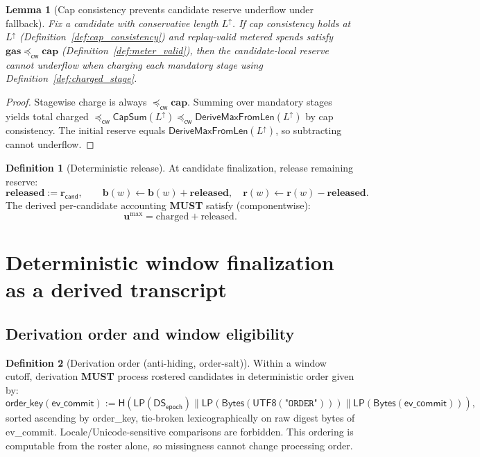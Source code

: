\documentclass[11pt]{article}
\newcommand{\MUST}{\textbf{MUST}}
\newcommand{\1}{\mathbf{1}}
\newcommand{\Hash}{\mathsf{H}}
\newcommand{\DS}{\mathsf{DS}}
\newcommand{\LP}{\mathsf{LP}}
\newcommand{\cwise}{\preceq_{\textsf{cw}}}
\theoremstyle{definition}
\newtheorem{definition}{Definition}
\theoremstyle{plain}
\newtheorem{lemma}{Lemma}
\begin{document}
\begin{lemma}[Cap consistency prevents candidate reserve underflow under fallback]
\label{lem:cap_prevents_underflow}
Fix a candidate with conservative length $L^\uparrow$. If cap consistency holds at $L^\uparrow$ (Definition~\ref{def:cap_consistency}) and replay-valid metered spends satisfy $\mathbf{gas}\cwise\mathbf{cap}$ (Definition~\ref{def:meter_valid}), then the candidate-local reserve cannot underflow when charging each mandatory stage using Definition~\ref{def:charged_stage}.
\end{lemma}
\begin{proof}
Stagewise charge is always $\cwise \mathbf{cap}$. Summing over mandatory stages yields total charged
$\cwise \mathsf{CapSum}(L^\uparrow)\cwise \mathsf{DeriveMaxFromLen}(L^\uparrow)$ by cap consistency. The initial reserve equals $\mathsf{DeriveMaxFromLen}(L^\uparrow)$, so subtracting cannot underflow.
\end{proof}

\begin{definition}[Deterministic release]
\label{def:release}
At candidate finalization, release remaining reserve:
\[
\mathbf{released}:=\mathbf{r}_{\textsf{cand}},\qquad
\mathbf{b}(w)\leftarrow\mathbf{b}(w)+\mathbf{released},\quad
\mathbf{r}(w)\leftarrow\mathbf{r}(w)-\mathbf{released}.
\]
The derived per-candidate accounting \MUST{} satisfy (componentwise):
\[
\mathbf{u}^{\max}=\mathrm{charged}+\mathrm{released}.
\]
\end{definition}

\section{Deterministic window finalization as a derived transcript}
\label{sec:derive}

\subsection{Derivation order and window eligibility}

\begin{definition}[Derivation order (anti-hiding, order-salt)]
\label{def:derive_order}
Within a window cutoff, derivation \MUST{} process rostered candidates in deterministic order given by:
\[
\textsf{order\_key}(\textsf{ev\_commit})
:=
\Hash\!\left(
\LP(\DS_{\textsf{epoch}})\|\LP(\mathsf{Bytes}(\textsf{UTF8}(\texttt{"ORDER"})))\|\LP(\mathsf{Bytes}(\textsf{ev\_commit}))
\right),
\]
sorted ascending by \textsf{order\_key}, tie-broken lexicographically on raw digest bytes of \textsf{ev\_commit}. Locale/Unicode-sensitive comparisons are forbidden.
This ordering is computable from the roster alone, so missingness cannot change processing order.
\end{definition}
\end{document}
